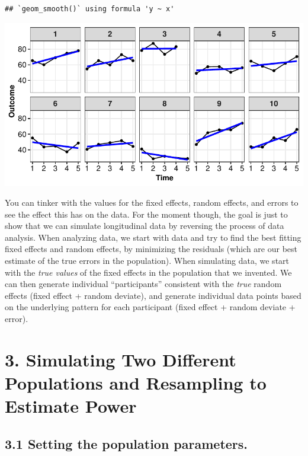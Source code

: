 \documentclass[
]{article}
\begin{document}
\begin{verbatim}
## `geom_smooth()` using formula 'y ~ x'
\end{verbatim}

\begin{center}\includegraphics{lohse_ACRM_2023_module_04_files/figure-latex/figure 2-1} \end{center}

You can tinker with the values for the fixed effects, random effects,
and errors to see the effect this has on the data. For the moment
though, the goal is just to show that we can simulate longitudinal data
by reversing the process of data analysis. When analyzing data, we start
with data and try to find the best fitting fixed effects and random
effects, by minimizing the residuals (which are our best estimate of the
true errors in the population). When simulating data, we start with the
\emph{true values} of the fixed effects in the population that we
invented. We can then generate individual ``participants'' consistent
with the \emph{true} random effects (fixed effect + random deviate), and
generate individual data points based on the underlying pattern for each
participant (fixed effect + random deviate + error).

\hypertarget{simulating-two-different-populations-and-resampling-to-estimate-power}{%
\section{3. Simulating Two Different Populations and Resampling to
Estimate
Power}\label{simulating-two-different-populations-and-resampling-to-estimate-power}}

\hypertarget{setting-the-population-parameters.}{%
\subsection{3.1 Setting the population
parameters.}\label{setting-the-population-parameters.}}
\end{document}
